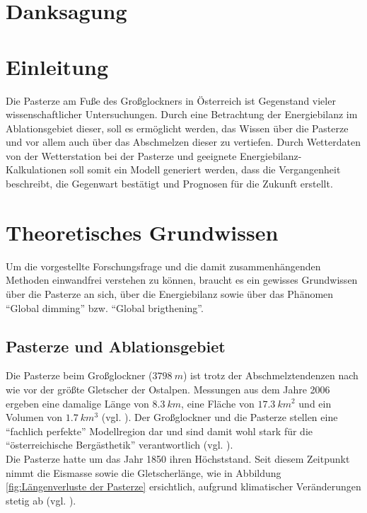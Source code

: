 \documentclass[12pt,a4paper]{article}
\begin{document}
\pagebreak
\section*{Danksagung}

\pagebreak

\tableofcontents
\vspace{1cm}

\pagebreak
\listoffigures
\vspace{1cm}

\pagebreak
\listoftables
\vspace{1cm}


\pagebreak
{}  
\setcounter{page}{1}

\section{Einleitung}
Die Pasterze am Fuße des Großglockners in Österreich ist Gegenstand vieler wissenschaftlicher Untersuchungen. Durch eine Betrachtung der Energiebilanz im Ablationsgebiet dieser, soll es ermöglicht werden, das Wissen über die Pasterze und vor allem auch über das Abschmelzen dieser zu vertiefen. Durch Wetterdaten von der Wetterstation bei der Pasterze und geeignete Energiebilanz-Kalkulationen soll somit ein Modell generiert werden, dass die Vergangenheit beschreibt, die Gegenwart bestätigt und Prognosen für die Zukunft erstellt.


\section{Theoretisches Grundwissen}
Um die vorgestellte Forschungsfrage und die damit zusammenhängenden Methoden einwandfrei verstehen zu können, braucht es ein gewisses Grundwissen über die Pasterze an sich, über die Energiebilanz sowie über das Phänomen ``Global dimming'' bzw. ``Global brigthening''.

\subsection{Pasterze und Ablationsgebiet}
Die Pasterze beim Großglockner ($3798~m$) ist trotz der Abschmelztendenzen nach wie vor der größte Gletscher der Ostalpen. Messungen aus dem Jahre 2006 ergeben eine damalige Länge von $8.3~km$, eine Fläche von $17.3~km^2$ und ein Volumen von $1.7~km^3$ (vgl. \cite[10]{Pasterze}). Der Großglockner und die Pasterze stellen eine ``fachlich perfekte'' Modellregion dar und sind damit wohl stark für die ``österreichische Bergästhetik'' verantwortlich (vgl. \cite[13]{Pasterze}).\\
Die Pasterze hatte um das Jahr 1850 ihren Höchststand. Seit diesem Zeitpunkt nimmt die Eismasse sowie die Gletscherlänge, wie in Abbildung \ref{fig:Längenverluste der Pasterze} ersichtlich, aufgrund klimatischer Veränderungen stetig ab (vgl. \cite[17]{Pasterze}).\\
\end{document}
